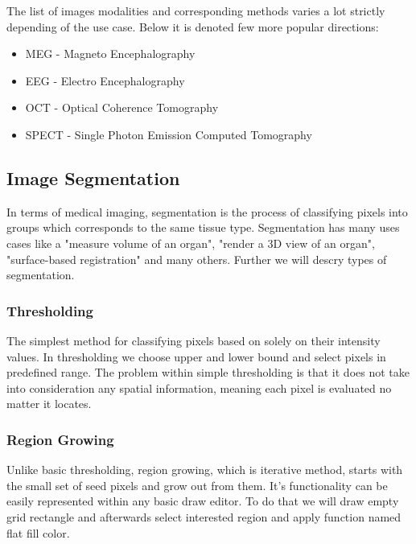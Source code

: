 The list of images modalities and corresponding methods varies a lot strictly depending of the use case.
Below it is denoted few more popular directions:
\begin{itemize}
    \item MEG - Magneto Encephalography
    \item EEG - Electro Encephalography
    \item OCT - Optical Coherence Tomography
    \item SPECT - Single Photon Emission Computed Tomography
\end{itemize}


\subsection{Image Segmentation}
In terms of medical imaging, segmentation is the process of classifying pixels into groups which corresponds to the same tissue type. Segmentation has many uses cases like a "measure volume of an organ", "render a 3D view of an organ", "surface-based registration" and many others. Further we will descry types of segmentation. 

\subsubsection{Thresholding}
The simplest method for classifying pixels based on solely on their intensity values. In thresholding we choose upper and lower bound and select pixels in predefined range.
The problem within simple thresholding is that it does not take into consideration any spatial information, meaning each pixel is evaluated no matter it locates.    

\subsubsection{Region Growing}
Unlike basic thresholding, region growing, which is iterative method, starts with the small set of seed pixels and grow out from them.
It's functionality can be easily represented within any basic draw editor. To do that we will draw empty grid rectangle and afterwards select interested region and apply function named flat fill color.  


